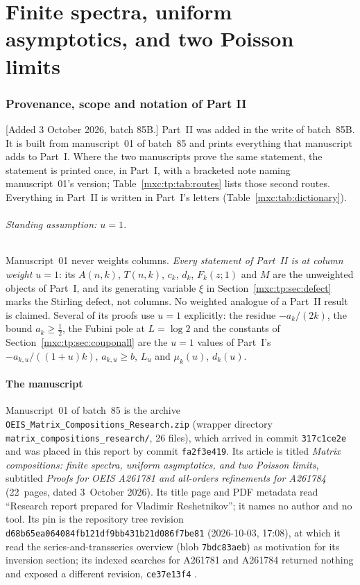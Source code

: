 \documentclass[11pt]{article}
\numberwithin{equation}{section}
\theoremstyle{definition}
\theoremstyle{remark}
\begin{document}
\part{Finite spectra, uniform asymptotics, and two Poisson limits}
\label{mxc:tp:part}

\section{Provenance, scope and notation of Part II}\label{mxc:tp:sec:front}

[Added 3 October 2026, batch 85B.] Part~II was added in the write of
batch~85B. It is built from manuscript~01 of batch~85 and prints
everything that manuscript adds to Part~I. Where the two manuscripts prove
the same statement, the statement is printed once, in Part~I, with a
bracketed note naming manuscript~01's version; Table~\ref{mxc:tp:tab:routes}
lists those second routes. Everything in Part~II is written in Part~I's
letters (Table~\ref{mxc:tab:dictionary}).

\paragraph{Standing assumption: $u=1$.} Manuscript~01 never weights
columns. \emph{Every statement of Part~II is at column weight $u=1$}: its
$A(n,k)$, $T(n,k)$, $c_k$, $d_k$, $F_k(z;1)$ and $M$ are the unweighted
objects of Part~I, and its generating variable $\xi$ in
Section~\ref{mxc:tp:sec:defect} marks the Stirling defect, not columns.
No weighted analogue of a Part~II result is claimed. Several of its proofs
use $u=1$ explicitly: the residue $-a_k/(2k)$, the bound $a_k\ge\frac12$,
the Fubini pole at $L=\log2$ and the constants of
Section~\ref{mxc:tp:sec:couponall} are the $u=1$ values of Part~I's
$-a_{k,u}/((1+u)k)$, $a_{k,u}\ge b$, $L_u$ and $\mu_k(u)$, $d_k(u)$.

\subsection{The manuscript}
Manuscript~01 of batch~85 is the archive
\nolinkurl{OEIS_Matrix_Compositions_Research.zip} (wrapper directory
\nolinkurl{matrix_compositions_research/}, 26 files), which arrived in
commit \texttt{317c1ce2e} and was placed in this report by commit
\texttt{fa2f3e419}. Its article is titled \emph{Matrix compositions: finite
spectra, uniform asymptotics, and two Poisson limits}, subtitled
\emph{Proofs for OEIS A261781 and all-orders refinements for A261784}
(22~pages, dated 3~October 2026). Its title page and PDF metadata read
``Research report prepared for Vladimir Reshetnikov''; it names no author
and no tool. Its pin is the repository tree revision
\texttt{d68b65ea064084fb121df9bb431b21d086f7be81} (2026-10-03, 17:08), at
which it read the series-and-transseries overview
 (blob
\texttt{7bdc83aeb}) as motivation for its inversion section; its indexed
searches for A261781 and A261784 returned nothing and exposed a different
revision, \texttt{ce37e13f4} \cite{proveit01}.
\end{document}
